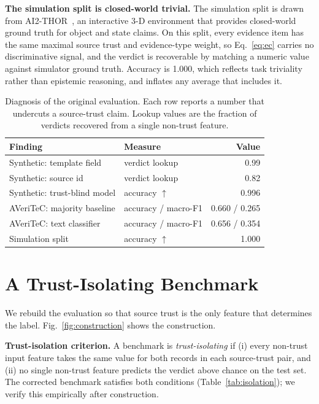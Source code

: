 \documentclass[conference]{IEEEtran}
\begin{document}
\textbf{The simulation split is closed-world trivial.} The simulation split is drawn from AI2-THOR~\cite{kolve2017ai2thor}, an interactive 3-D environment that provides closed-world ground truth for object and state claims. On this split, every evidence item has the same maximal source trust and evidence-type weight, so Eq.~\eqref{eq:ec} carries no discriminative signal, and the verdict is recoverable by matching a numeric value against simulator ground truth. Accuracy is 1.000, which reflects task triviality rather than epistemic reasoning, and inflates any average that includes it.

\begin{table}[t]
\caption{Diagnosis of the original evaluation. Each row reports a number that undercuts a source-trust claim. Lookup values are the fraction of verdicts recovered from a single non-trust feature.}
\label{tab:diagnosis}
\centering
\begin{tabular}{@{}llr@{}}
\toprule
Finding & Measure & Value \\
\midrule
Synthetic: template field & verdict lookup & 0.99 \\
Synthetic: source id & verdict lookup & 0.82 \\
Synthetic: trust-blind model & accuracy $\uparrow$ & 0.996 \\
AVeriTeC: majority baseline & accuracy / macro-F1 & 0.660 / 0.265 \\
AVeriTeC: text classifier & accuracy / macro-F1 & 0.656 / 0.354 \\
Simulation split & accuracy $\uparrow$ & 1.000 \\
\bottomrule
\end{tabular}
\end{table}

\section{A Trust-Isolating Benchmark}
\label{sec:benchmark}
We rebuild the evaluation so that source trust is the only feature that determines the label. Fig.~\ref{fig:construction} shows the construction.

\textbf{Trust-isolation criterion.} A benchmark is \emph{trust-isolating} if (i) every non-trust input feature takes the same value for both records in each source-trust pair, and (ii) no single non-trust feature predicts the verdict above chance on the test set. The corrected benchmark satisfies both conditions (Table~\ref{tab:isolation}); we verify this empirically after construction.
\end{document}
